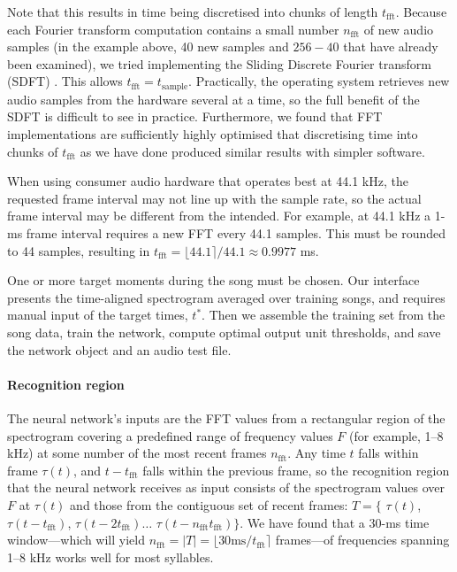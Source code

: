 \documentclass[10pt,letterpaper]{article}
\renewcommand{\subsubsection}[1]{\paragraph{#1}}
\begin{document}
Note that this results in time being discretised into chunks of length
$t_\mathrm{fft}$.  Because each Fourier transform computation contains
a small number $n_\mathrm{fft}$ of new audio samples (in the example
above, 40 new samples and $256-40$ that have already been examined),
we tried implementing the Sliding Discrete Fourier transform (SDFT)
\cite{Jacobsen2003SlidingDFT}.  This allows
$t_\textrm{fft}=t_\textrm{sample}$.  Practically, the operating system
retrieves new audio samples from the hardware several at a time, so
the full benefit of the SDFT is difficult to see in practice.
Furthermore, we found that FFT implementations are sufficiently highly
optimised that discretising time into chunks of $t_\mathrm{fft}$ as we
have done produced similar results with simpler software.

When using consumer audio hardware that operates best at 44.1 kHz, the
requested frame interval may not line up with the sample rate, so the
actual frame interval may be different from the intended.  For
example, at 44.1 kHz a 1-ms frame interval requires a new FFT every
44.1 samples.  This must be rounded to 44 samples, resulting in
$t_\textrm{fft}=\lfloor 44.1 \rceil / 44.1 \approx 0.9977$ ms.

One or more target moments during the song must be chosen.  Our
interface presents the time-aligned spectrogram averaged over training
songs, and requires manual input of the target times, $t^*$.  Then we
assemble the training set from the song data, train the network,
compute optimal output unit thresholds, and save the network object
and an audio test file.

\subsubsection{Recognition region}
\label{sec:recognitionregion}

The neural network's inputs are the FFT values from a rectangular
region of the spectrogram covering a predefined range of frequency
values $F$ (for example, 1--8 kHz) at some number of the most recent
frames $n_\textrm{fft}$.  Any time $t$ falls within frame
$\tau(t)$, and $t-t_\textrm{fft}$ falls within the previous frame, so the recognition region that the neural network receives as input
consists of the spectrogram values over $F$ at $\tau(t)$ and those
from the contiguous set of recent frames: $T = \{$ $\tau(t)$,
$\tau(t-t_\textrm{fft})$, $\tau(t-{2t_\textrm{fft}})\ldots$
$\tau(t-n_\textrm{fft}t_\textrm{fft})\}$.  We have found that a 30-ms
time window---which will yield $n_\textrm{fft} = |T|=\lfloor 30\textrm{
  ms}/t_\textrm{fft}\rceil$ frames---of frequencies spanning 1--8 kHz
works well for most syllables.
\end{document}

